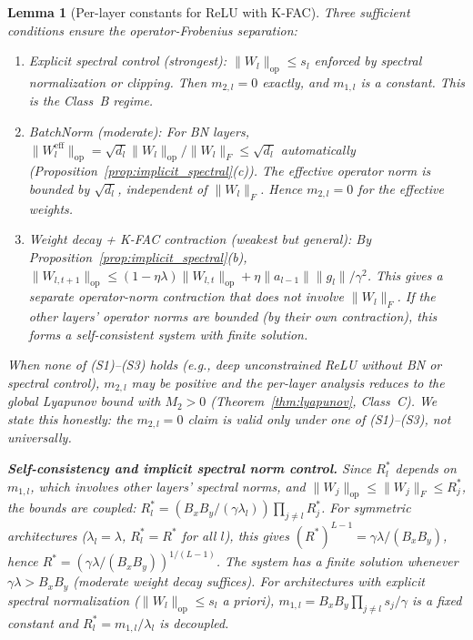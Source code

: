 \documentclass{article}
\providecommand{\norm}[1]{\lVert #1 \rVert}
\theoremstyle{plain}
\newtheorem{lemma}{Lemma}
\theoremstyle{definition}
\theoremstyle{remark}
\begin{document}
\begin{lemma}[Per-layer constants for ReLU with K-FAC]
Three sufficient conditions ensure the operator-Frobenius separation:
\begin{enumerate}
    \item[(S1)] \emph{Explicit spectral control} (strongest): $\norm{W_l}_{\mathrm{op}} \leq s_l$ enforced by spectral normalization or clipping. Then $m_{2,l} = 0$ exactly, and $m_{1,l}$ is a constant. This is the Class~B regime.
    \item[(S2)] \emph{BatchNorm} (moderate): For BN layers, $\norm{W_l^{\mathrm{eff}}}_{\mathrm{op}} = \sqrt{d_l}\norm{W_l}_{\mathrm{op}}/\norm{W_l}_F \leq \sqrt{d_l}$ automatically (Proposition~\ref{prop:implicit_spectral}(c)). The effective operator norm is bounded by $\sqrt{d_l}$, independent of $\norm{W_l}_F$. Hence $m_{2,l} = 0$ for the \emph{effective} weights.
    \item[(S3)] \emph{Weight decay + K-FAC contraction} (weakest but general): By Proposition~\ref{prop:implicit_spectral}(b), $\norm{W_{l,t+1}}_{\mathrm{op}} \leq (1-\eta\lambda)\norm{W_{l,t}}_{\mathrm{op}} + \eta\norm{a_{l-1}}\norm{g_l}/\gamma^2$. This gives a \emph{separate} operator-norm contraction that does not involve $\norm{W_l}_F$. If the other layers' operator norms are bounded (by their own contraction), this forms a self-consistent system with finite solution.
\end{enumerate}
When none of (S1)--(S3) holds (e.g., deep unconstrained ReLU without BN or spectral control), $m_{2,l}$ may be positive and the per-layer analysis reduces to the global Lyapunov bound with $M_2 > 0$ (Theorem~\ref{thm:lyapunov}, Class~C). We state this honestly: the $m_{2,l} = 0$ claim is valid \emph{only under one of (S1)--(S3)}, not universally.

\textbf{Self-consistency and implicit spectral norm control.} Since $R_l^*$ depends on $m_{1,l}$, which involves other layers' spectral norms, and $\norm{W_j}_{\mathrm{op}} \leq \norm{W_j}_F \leq R_j^*$, the bounds are coupled: $R_l^* = (B_x B_y/(\gamma\lambda_l))\prod_{j \neq l}R_j^*$. For symmetric architectures ($\lambda_l = \lambda$, $R_l^* = R^*$ for all $l$), this gives $(R^*)^{L-1} = \gamma\lambda/(B_x B_y)$, hence $R^* = (\gamma\lambda/(B_x B_y))^{1/(L-1)}$. The system has a finite solution whenever $\gamma\lambda > B_x B_y$ (moderate weight decay suffices). For architectures with explicit spectral normalization ($\norm{W_l}_{\mathrm{op}} \leq s_l$ a priori), $m_{1,l} = B_x B_y \prod_{j \neq l}s_j/\gamma$ is a fixed constant and $R_l^* = m_{1,l}/\lambda_l$ is decoupled.
\end{lemma}
\end{document}
